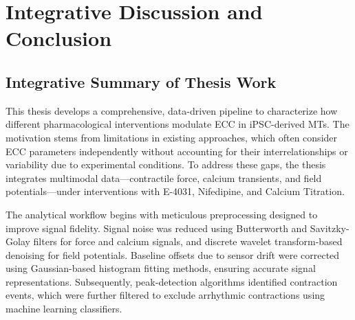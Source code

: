 \documentclass{report}
\begin{document}
    

\chapter{Integrative Discussion and Conclusion}

    \section{Integrative Summary of Thesis Work}
    This thesis develops a comprehensive, data-driven pipeline to characterize how different pharmacological interventions modulate ECC in iPSC-derived MTs. The motivation stems from limitations in existing approaches, which often consider ECC parameters independently without accounting for their interrelationships or variability due to experimental conditions. To address these gaps, the thesis integrates multimodal data—contractile force, calcium transients, and field potentials—under interventions with E-4031, Nifedipine, and Calcium Titration.

    The analytical workflow begins with meticulous preprocessing designed to improve signal fidelity. Signal noise was reduced using Butterworth and Savitzky-Golay filters for force and calcium signals, and discrete wavelet transform-based denoising for field potentials. Baseline offsets due to sensor drift were corrected using Gaussian-based histogram fitting methods, ensuring accurate signal representations. Subsequently, peak-detection algorithms identified contraction events, which were further filtered to exclude arrhythmic contractions using machine learning classifiers.
    
\end{document}
